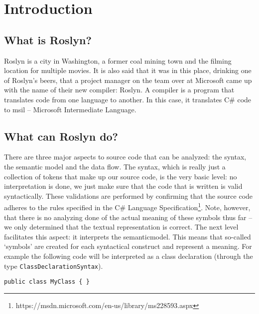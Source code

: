 \chapter{Introduction}
\label{ch:introduction}

\section{What is Roslyn?}
\label{sec:intro-what?}

Roslyn is a city in Washington, a former coal mining town and the filming location for multiple movies. It is also said that it was in this place, drinking one of Roslyn's beers, that a project manager on the  team over at Microsoft came up with the name of their new \gls{compiler}: Roslyn.\parencite{Wischik2014} A compiler is a program that translates code from one language to another. In this case, it translates C\# code to \gls{msil} -- Microsoft Intermediate Language.

\section{What can Roslyn do?}
\label{sec:intro-what-can}

There are three major aspects to source code that can be analyzed: the syntax, the semantic model and the data flow. 
The \gls{syntax}, which is really just a collection of tokens that make up our source code, is the very basic level: no interpretation is done, we just make sure that the code that is written is valid syntactically. These validations are performed by confirming that the source code adheres to the rules specified in the C\# Language Specification\footnote{https://msdn.microsoft.com/en-us/library/ms228593.aspx}. Note, however, that there is no analyzing done of the actual meaning of these symbols thus far – we only determined that the textual representation is correct.
The next level facilitates this aspect: it interprets the \gls{semanticmodel}. This means that so-called ‘symbols’ are created for each syntactical construct and represent a meaning. For example the following code will be interpreted as a class declaration (through the type \texttt{ClassDeclarationSyntax}).

\begin{lstlisting}
public class MyClass { }
\end{lstlisting}


